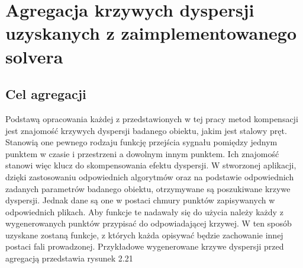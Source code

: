 \section{Agregacja krzywych dyspersji uzyskanych z zaimplementowanego solvera}
\label{sec:agregacja}

\subsection{Cel agregacji}
Podstawą opracowania każdej z przedstawionych w tej pracy metod kompensacji jest znajomość krzywych dyspersji badanego obiektu, jakim jest stalowy pręt. Stanowią one pewnego rodzaju funkcję przejścia sygnału pomiędzy jednym punktem w czasie i przestrzeni a dowolnym innym punktem. Ich znajomość stanowi więc klucz do skompensowania efektu dyspersji. W stworzonej aplikacji, dzięki zastosowaniu odpowiednich algorytmów oraz na podstawie odpowiednich zadanych parametrów badanego obiektu, otrzymywane są poszukiwane krzywe dyspersji. Jednak dane są one w postaci chmury punktów zapisywanych w odpowiednich plikach. Aby funkcje te nadawały się do użycia należy każdy z wygenerowanych punktów przypisać do odpowiadającej krzywej. W ten sposób uzyskane zostaną funkcje, z których każda opisywać będzie zachowanie innej postaci fali prowadzonej. Przykładowe wygenerowane krzywe dyspersji przed agregacją przedstawia rysunek 2.21

